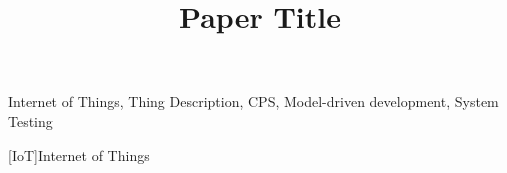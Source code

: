 \documentclass[conference]{IEEEtran}
\theoremstyle{definition}
\begin{document}
\title{Paper Title}

\author{
}

\maketitle



\begin{abstract}


\end{abstract}
\cite{wotTD}
\begin{IEEEkeywords}
Internet of Things, Thing Description, CPS, Model-driven development, System Testing
\end{IEEEkeywords}


\begin{acronym}[ECU]
[IoT]{Internet of Things}
\end{acronym}

%



\end{document}
